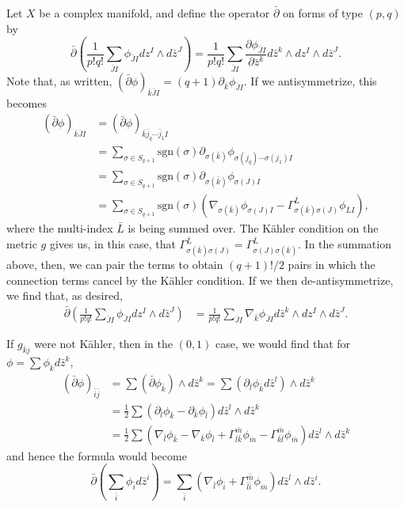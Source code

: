 \documentclass{../mathnotes}
\begin{document}
Let $X$ be a complex manifold, and define the operator $\bar\partial$ on forms of type $(p,q)$ by
\[\bar\partial\left( \frac{1}{p!q!}\sum_{\bar JI}\phi_{\bar JI}dz^I\wedge d\bar z^J \right)=\frac{1}{p!q!}\sum_{\bar JI}\frac{\partial\phi_{\bar JI}}{\partial\bar z^k}d\bar z^k\wedge dz^I\wedge d\bar z^J.\]
Note that, as written, $(\bar\partial\phi)_{\bar k\bar JI}=(q+1)\partial_{\bar k}\phi_{\bar JI}$. If we antisymmetrize, this becomes
\begin{align*}
    (\bar\partial\phi)_{\bar k\bar JI}&=(\bar\partial\phi)_{\bar k\bar j_q\cdots\bar j_1 I}\\
    &=\sum_{\sigma\in S_{q+1}}\text{sgn}(\sigma)\partial_{\sigma(\bar k)}\phi_{\sigma(j_q)\cdots\sigma(j_1)I}\\
    &=\sum_{\sigma\in S_{q+1}}\text{sgn}(\sigma)\partial_{\sigma(\bar k)}\phi_{\sigma(J)I}\\
    &=\sum_{\sigma\in S_{q+1}}\text{sgn}(\sigma)\left(\nabla_{\sigma(\bar k)}\phi_{\sigma(J)I}-\Gamma^{\bar L}_{\sigma(\bar k)\sigma(J)}\phi_{\bar LI}\right),
\end{align*}
where the multi-index $\bar L$ is being summed over. The K\"ahler condition on the metric $g$ gives us, in this case, that
$\Gamma^{\bar L}_{\sigma(\bar k)\sigma(J)}=\Gamma^{\bar L}_{\sigma(J)\sigma(\bar k)}$. In the summation above, then,
we can pair the terms to obtain $(q+1)!/2$ pairs in which the connection terms cancel by the K\"ahler condition. If we
then de-antisymmetrize, we find that, as desired,
\begin{align*}
    \bar\partial\left( \frac{1}{p!q!}\sum_{\bar JI}\phi_{\bar JI}dz^I\wedge d\bar z^J \right)&=\frac{1}{p!q!}\sum_{\bar JI}\nabla_{\bar k}\phi_{\bar JI}d\bar z^k\wedge dz^I\wedge d\bar z^J.
\end{align*}

If $g_{\bar k j}$ were not K\"ahler, then in the $(0,1)$ case, we would find that for $\phi=\sum\phi_kd\bar z^k$,
\begin{align*}
    (\bar\partial\phi)_{\bar i\bar j}&=\sum(\bar\partial\phi_{\bar k})\wedge d\bar z^k=\sum(\partial_{\bar l}\phi_{\bar k}d\bar z^l)\wedge d\bar z^k\\
    &=\frac{1}{2}\sum\left( \partial_{\bar l}\phi_{\bar k} -\partial_{\bar k}\phi_{\bar l}\right)d\bar z^l\wedge d\bar z^k\\
    &=\frac{1}{2}\sum\left( \nabla_{\bar l}\phi_{\bar k}-\nabla_{\bar k}\phi_{\bar l} +\Gamma^{\bar m}_{\bar l\bar k} \phi_{\bar m}-\Gamma^{\bar m}_{\bar k\bar l}\phi_{\bar m}\right)d\bar z^l\wedge d\bar z^k
\end{align*}
and hence the formula would become
\[\bar\partial\left( \sum_{\bar i}\phi_{\bar i} d\bar z^i \right)=\sum_{\bar i}(\nabla_{\bar l}\phi_{\bar i}+\Gamma^{\bar m}_{\bar l\bar i}\phi_{\bar m})d\bar z^l\wedge d\bar z^i.\]
\end{document}
